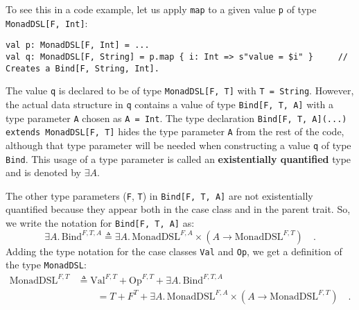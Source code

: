 To see this in a code example, let us apply \lstinline!map!
to a given value \lstinline!p!
of type \lstinline!MonadDSL[F, Int]!:
\begin{lstlisting}
val p: MonadDSL[F, Int] = ...
val q: MonadDSL[F, String] = p.map { i: Int => s"value = $i" }     // Creates a Bind[F, String, Int].
\end{lstlisting}
The value \lstinline!q!
is declared to be of type \lstinline!MonadDSL[F, T]!
with \lstinline!T = String!.
However, the actual data structure in \lstinline!q!
contains a value of type \lstinline!Bind[F, T, A]!
with a type parameter \lstinline!A!
chosen as \lstinline!A = Int!.
The type declaration \lstinline!Bind[F, T, A](...) extends MonadDSL[F, T]!
hides the type parameter \lstinline!A!
from the rest of the code, although that type parameter will be needed
when constructing a value \lstinline!q!
of type \lstinline!Bind!.
This usage of a type parameter is called an \textbf{existentially
quantified} type and is denoted by $\exists A$.

The other type parameters (\lstinline!F!,
\lstinline!T!) in \lstinline!Bind[F, T, A]!
are not existentially quantified because they appear both in the case
class and in the parent trait. So, we write the notation for \lstinline!Bind[F, T, A]!
as: 
\[
\exists A.\,\text{Bind}^{F,T,A}\triangleq\exists A.\,\text{MonadDSL}^{F,A}\times(A\rightarrow\text{MonadDSL}^{F,T})\quad.
\]
Adding the type notation for the case classes \lstinline!Val!
and \lstinline!Op!, we
get a definition of the type \lstinline!MonadDSL!:
\begin{align*}
\text{MonadDSL}^{F,T} & \triangleq\text{Val}^{F,T}+\text{Op}^{F,T}+\exists A.\,\text{Bind}^{F,T,A}\\
 & \quad\quad=T+F^{T}+\exists A.\,\text{MonadDSL}^{F,A}\times(A\rightarrow\text{MonadDSL}^{F,T})\quad.
\end{align*}

